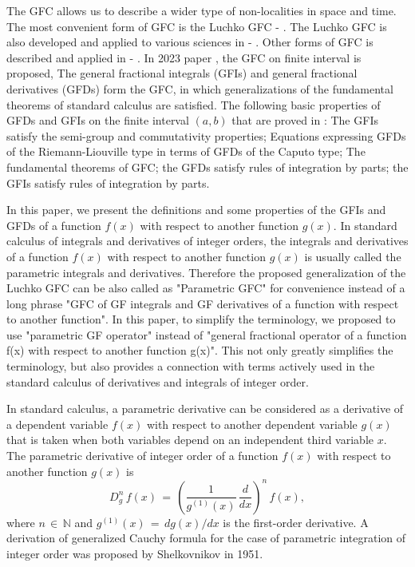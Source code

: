\documentclass[12pt]{article}
\begin{document}
The GFC allows us to describe a wider type of non-localities in space and time. 
The most convenient form of GFC is the Luchko GFC \cite{Luchko2021-1} - \cite{Luchko2023}. 
The Luchko GFC is also developed and applied to various sciences in \cite{Mathematics2021-3} - \cite{Atanackovic2023-2}. 
Other forms of GFC is described and applied in \cite{Kochubei2011} - \cite{Bazhlekova2021}.
In 2023 paper \cite{Luchko2023}, the GFC on finite interval is proposed, 
The general fractional integrals (GFIs) and general fractional derivatives (GFDs) form the GFC, in which generalizations of the fundamental theorems of standard calculus are satisfied. 
The following basic properties of GFDs and GFIs on the finite interval $(a,b)$ that are proved in \cite{Luchko2023}: 
The GFIs satisfy the semi-group and commutativity properties;
Equations expressing GFDs of the Riemann-Liouville type in terms of GFDs of the Caputo type;
The fundamental theorems of GFC;
the GFDs satisfy rules of integration by parts;
the GFIs satisfy rules of integration by parts.

In this paper, we present the definitions and some properties of the GFIs and GFDs of a function $f(x)$ with respect to another function $g(x)$.
In standard calculus of integrals and derivatives of integer orders, the integrals and derivatives of a function $f(x)$ with respect to another function $g(x)$ is usually called the parametric integrals and derivatives.
Therefore the proposed generalization of the Luchko GFC can be also called as "Parametric GFC" for convenience instead of a long phrase "GFC of GF integrals and GF derivatives of a function with respect to another function". 
In this paper, to simplify the terminology, we proposed to use "parametric GF operator" instead of "general fractional operator of a function f(x) with respect to another function g(x)". This not only greatly simplifies the terminology, but also provides a connection with terms actively used in the standard calculus of derivatives and integrals of integer order.



In standard calculus, a parametric derivative can be considered as a derivative of a dependent variable $f(x)$ with respect to another dependent variable $g(x)$ that is taken when both variables depend 
on an independent third variable $x$.
The parametric derivative of integer order of a function $f(x)$ with respect to another function $g(x)$ is
\[
D^n_g \, f(x) \, = \, 
\left(\frac{1}{g^{(1)}(x)} \, \frac{d}{dx}\right)^n \, f(x) ,
\]
where $n \, \in \, \mathbb{N}$ and 
$g^{(1)}(x) \, = \, dg(x)/dx$ is the first-order derivative.
A derivation of generalized Cauchy formula for the case of parametric integration of integer order was proposed by Shelkovnikov \cite{Shelkovnikov1951} in 1951. 
\end{document}
